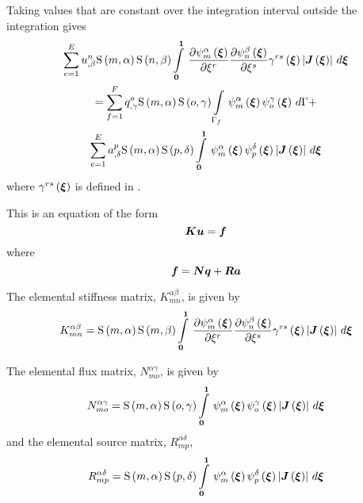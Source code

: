 Taking values that are constant over the integration interval outside the
integration gives
\begin{multline}
  \dsum_{e=1}^{E}\nodedof{u}{n}{\beta}\gsf{m}{\alpha}\gsf{n}{\beta}
  \gint{\vect{0}}{\vect{1}}{\delby{\gbfn{m}{\alpha}{\vect{\xi}}}{\xi^{r}}
  \delby{\gbfn{n}{\beta}{\vect{\xi}}}{\xi^{s}}\fnof{\gamma^{rs}}{\vect{\xi}}
  \abs{\fnof{\matr{J}}{\vect{\xi}}}}{\vect{\xi}} \\ 
  =\dsum_{f=1}^{F}\nodedof{q}{o}{\gamma}\gsf{m}{\alpha}\gsf{o}{\gamma}
  \gint{\Gamma_{f}}{}{\gbfn{m}{\alpha}{\vect{\xi}}\gbfn{o}{\gamma}{\vect{\xi}}
  }{\Gamma} + \\
  \dsum_{e=1}^{E}\nodedof{a}{p}{\delta}\gsf{m}{\alpha}\gsf{p}{\delta}
  \gint{\vect{0}}{\vect{1}}{\gbfn{m}{\alpha}{\vect{\xi}}
    \gbfn{p}{\delta}{\vect{\xi}}\abs{\fnof{\matr{J}}{\vect{\xi}}}}{\vect{\xi}}
\end{multline}
where $\fnof{\gamma^{rs}}{\vect{\xi}}$ is defined in 
.

This is an equation of the form
\begin{equation}
  \matr{K}\vect{u}=\vect{f}
\end{equation}
where
\begin{equation}
  \vect{f}=\matr{N}\vect{q}+\matr{R}\vect{a}
\end{equation}

The elemental stiffness matrix, $K^{\alpha\beta}_{mn}$, is given by
\begin{equation}
  K^{\alpha\beta}_{mn}=\gsf{m}{\alpha}\gsf{m}{\beta}
  \gint{\vect{0}}{\vect{1}}{\delby{\gbfn{m}{\alpha}{\vect{\xi}}}{\xi^{r}}
    \delby{\gbfn{n}{\beta}{\vect{\xi}}}{\xi^{s}}\fnof{\gamma^{rs}}{\vect{\xi}}
    \abs{\fnof{\matr{J}}{\vect{\xi}}}}{\vect{\xi}}
  \label{eqn:elementalfemlhs2}
\end{equation}

The elemental flux matrix, $N^{\alpha\gamma}_{mo}$, is given by
\begin{equation}
  N^{\alpha\gamma}_{mo} =\gsf{m}{\alpha}\gsf{o}{\gamma}
  \gint{\vect{0}}{\vect{1}}{\gbfn{m}{\alpha}{\vect{\xi}}\gbfn{o}{\gamma}{\vect{\xi}}
    \abs{\fnof{\matr{J}}{\vect{\xi}}}}{\vect{\xi}}
\end{equation}
and the elemental source matrix, $R^{\alpha\delta}_{mp}$, 
\begin{equation}
  R^{\alpha\delta}_{mp}=\gsf{m}{\alpha}\gsf{p}{\delta}
  \gint{\vect{0}}{\vect{1}}{\gbfn{m}{\alpha}{\vect{\xi}}\gbfn{p}{\delta}{\vect{\xi}}
    \abs{\fnof{\matr{J}}{\vect{\xi}}}}{\vect{\xi}}
\end{equation}

